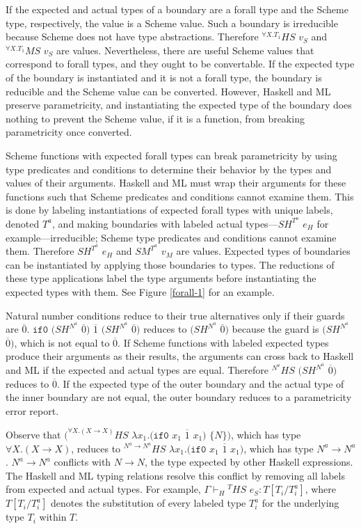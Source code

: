 If the expected and actual types of a boundary are a forall type and the Scheme type, respectively, the value is a Scheme value.  Such a boundary is irreducible because Scheme does not have type abstractions.  Therefore $^{\forall X.T_{1}}HS$ $v_{S}$ and $^{\forall X.T_{1}}MS$ $v_{S}$ are values.  Nevertheless, there are useful Scheme values that correspond to forall types, and they ought to be convertable.  If the expected type of the boundary is instantiated and it is not a forall type, the boundary is reducible and the Scheme value can be converted.  However, Haskell and ML preserve parametricity, and instantiating the expected type of the boundary does nothing to prevent the Scheme value, if it is a function, from breaking parametricity once converted.

Scheme functions with expected forall types can break parametricity by using type predicates and conditions to determine their behavior by the types and values of their arguments.  Haskell and ML must wrap their arguments for these functions such that Scheme predicates and conditions cannot examine them.  This is done by labeling instantiations of expected forall types with unique labels, denoted $T^{a}$, and making boundaries with labeled actual types---$SH^{T^{a}}$ $e_{H}$ for example---irreducible; Scheme type predicates and conditions cannot examine them.  Therefore $SH^{T^{a}}$ $e_{H}$ and $SM^{T^{a}}$ $v_{M}$ are values.  Expected types of boundaries can be instantiated by applying those boundaries to types.  The reductions of these type applications label the type arguments before instantiating the expected types with them.  See Figure \ref{forall-1} for an example.



Natural number conditions reduce to their true alternatives only if their guards are $\overline{0}$.  $\mathtt{if0}$ $(SH^{N^{a}}$ $\overline{0})$ $\overline{1}$ $(SH^{N^{a}}$ $\overline{0})$ reduces to $(SH^{N^{a}}$ $\overline{0})$ because the guard is $(SH^{N^{a}}$ $\overline{0})$, which is not equal to $\overline{0}$.  If Scheme functions with labeled expected types produce their arguments as their results, the arguments can cross back to Haskell and ML if the expected and actual types are equal.  Therefore $^{N^{a}}HS$ $(SH^{N^{a}}$ $\overline{0})$ reduces to $\overline{0}$.  If the expected type of the outer boundary and the actual type of the inner boundary are not equal, the outer boundary reduces to a parametricity error report.

Observe that $(^{\forall X.(X\rightarrow X)}HS$ $\lambda x_{1}.(\mathtt{if0}$ $x_{1}$ $\overline{1}$ $x_{1})$ $\lbrace N\rbrace)$, which has type $\forall X.(X\rightarrow X)$, reduces to $^{N^{a}\rightarrow N^{a}}HS$ $\lambda x_{1}.(\mathtt{if0}$ $x_{1}$ $\overline{1}$ $x_{1})$, which has type $N^{a}\rightarrow N^{a}$.  $N^{a}\rightarrow N^{a}$ conflicts with $N\rightarrow N$, the type expected by other Haskell expressions.  The Haskell and ML typing relations resolve this conflict by removing all labels from expected and actual types.  For example, $\Gamma\vdash_{H}{^{T}H}S$ $e_{S}:T[T_{i}/T^{a}_{i}]$, where $T[T_{i}/T_{i}^{a}]$ denotes the substitution of every labeled type $T_{i}^{a}$ for the underlying type $T_{i}$ within $T$.

